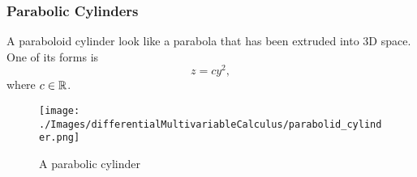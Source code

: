 \subsubsection{Parabolic Cylinders}
\noindent
A paraboloid cylinder look like a parabola that has been extruded into 3D space. One of its forms is
\begin{equation*}
	z = cy^2,
\end{equation*} 
where $c \in \mathbb{R}$.

\begin{figure}[H]
	\centering
	\texttt{[image: ./Images/differentialMultivariableCalculus/parabolid\_cylinder.png]}
	\caption{A parabolic cylinder}
\end{figure}
